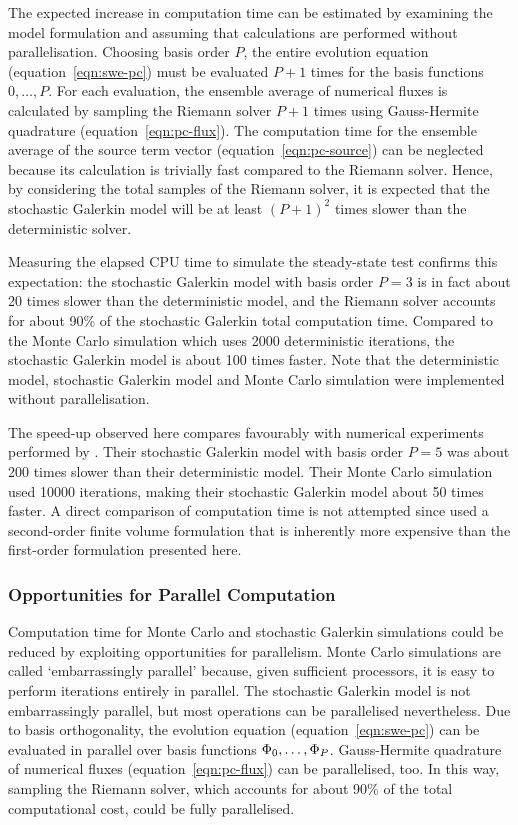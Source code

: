 The expected increase in computation time can be estimated by examining the model formulation and assuming that calculations are performed without parallelisation.
Choosing basis order $P$, the entire evolution equation (equation~\ref{eqn:swe-pc}) must be evaluated $P+1$ times for the basis functions $0, \ldots, P$.
For each evaluation, the ensemble average of numerical fluxes is calculated by sampling the Riemann solver $P+1$ times using Gauss-Hermite quadrature (equation~\ref{eqn:pc-flux}).
The computation time for the ensemble average of the source term vector (equation~\ref{eqn:pc-source}) can be neglected because its calculation is trivially fast compared to the Riemann solver. 
Hence, by considering the total samples of the Riemann solver, it is expected that the stochastic Galerkin model will be at least $\left(P+1\right)^2$ times slower than the deterministic solver.

Measuring the elapsed CPU time to simulate the steady-state test confirms this expectation: the stochastic Galerkin model with basis order $P=3$ is in fact about 20 times slower than the deterministic model, and the Riemann solver accounts for about 90\% of the stochastic Galerkin total computation time.
Compared to the Monte Carlo simulation which uses \num{2000} deterministic iterations, the stochastic Galerkin model is about 100 times faster.
Note that the deterministic model, stochastic Galerkin model and Monte Carlo simulation were implemented without parallelisation.

The speed-up observed here compares favourably with numerical experiments performed by \citet{ge2008}.
Their stochastic Galerkin model with basis order $P=5$ was about 200 times slower than their deterministic model.
Their Monte Carlo simulation used \num{10000} iterations, making their stochastic Galerkin model about 50 times faster.
A direct comparison of computation time is not attempted since \citet{ge2008} used a second-order finite volume formulation that is inherently more expensive than the first-order formulation presented here.

\subsubsection{Opportunities for Parallel Computation}

Computation time for Monte Carlo and stochastic Galerkin simulations could be reduced by exploiting opportunities for parallelism.
Monte Carlo simulations are called `embarrassingly parallel' because, given sufficient processors, it is easy to perform iterations entirely in parallel.
The stochastic Galerkin model is not embarrassingly parallel, but most operations can be parallelised nevertheless.
Due to basis orthogonality, the evolution equation (equation~\ref{eqn:swe-pc}) can be evaluated in parallel over basis functions $\Phi_0, \ldots, \Phi_P$.
Gauss-Hermite quadrature of numerical fluxes (equation~\ref{eqn:pc-flux}) can be parallelised, too.
In this way, sampling the Riemann solver, which accounts for about 90\% of the total computational cost, could be fully parallelised.

